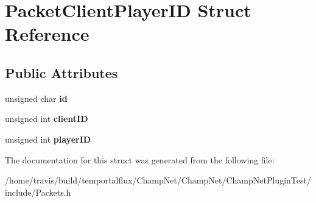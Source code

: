 \hypertarget{struct_packet_client_player_i_d}{\section{Packet\-Client\-Player\-I\-D Struct Reference}
\label{struct_packet_client_player_i_d}
}
\subsection*{Public Attributes}
\begin{DoxyCompactItemize}
\item 
\hypertarget{struct_packet_client_player_i_d_acce86d76b02d18b841377d80849d0f09}{unsigned char {\bfseries id}}\label{struct_packet_client_player_i_d_acce86d76b02d18b841377d80849d0f09}

\item 
\hypertarget{struct_packet_client_player_i_d_a7593dcd4306947a847f926db1c214576}{unsigned int {\bfseries client\-I\-D}}\label{struct_packet_client_player_i_d_a7593dcd4306947a847f926db1c214576}

\item 
\hypertarget{struct_packet_client_player_i_d_aba10b2aba2707dc70eb3714c900e516f}{unsigned int {\bfseries player\-I\-D}}\label{struct_packet_client_player_i_d_aba10b2aba2707dc70eb3714c900e516f}

\end{DoxyCompactItemize}


The documentation for this struct was generated from the following file\-:\begin{DoxyCompactItemize}
\item 
/home/travis/build/temportalflux/\-Champ\-Net/\-Champ\-Net/\-Champ\-Net\-Plugin\-Test/include/Packets.\-h\end{DoxyCompactItemize}
